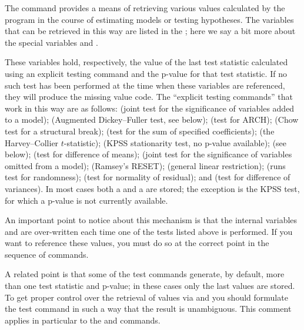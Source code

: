 The  command provides a means of retrieving various values
calculated by the program in the course of estimating models or
testing hypotheses.  The variables that can be retrieved in this way
are listed in the \GCR; here we say a bit more about the special
variables  and .

These variables hold, respectively, the value of the last test
statistic calculated using an explicit testing command and the p-value
for that test statistic.  If no such test has been performed at the
time when these variables are referenced, they will produce the
missing value code.  The ``explicit testing commands'' that work in
this way are as follows:  (joint test for the significance of
variables added to a model);  (Augmented Dickey--Fuller test,
see below);  (test for ARCH);  (Chow test for a
structural break);  (test for the sum of specified
coefficients);  (the Harvey--Collier $t$-statistic);
 (KPSS stationarity test, no p-value available);
 (see below);  (test for difference of
means);  (joint test for the significance of variables
omitted from a model);  (Ramsey's RESET); 
(general linear restriction);  (runs test for randomness);
 (test for normality of residual); and 
(test for difference of variances). In most cases both a 
and a  are stored; the exception is the KPSS test, for
which a p-value is not currently available.
    
An important point to notice about this mechanism is that the internal
variables  and  are over-written each time
one of the tests listed above is performed.  If you want to reference
these values, you must do so at the correct point in the sequence of
 commands.  

A related point is that some of the test commands generate, by
default, more than one test statistic and p-value; in these cases only
the last values are stored. To get proper control over the retrieval
of values via  and  you should formulate
the test command in such a way that the result is unambiguous.  This
comment applies in particular to the  and 
commands.

